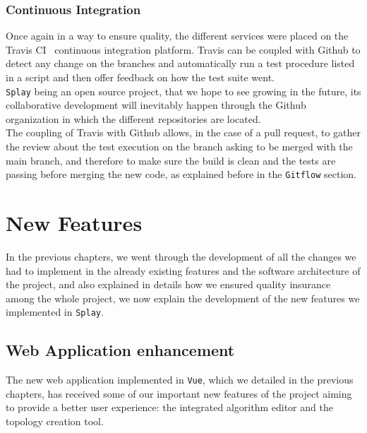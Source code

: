 \documentclass{eplmastersthesis}
\begin{document}
      \subsection{Continuous Integration}

        Once again in a way to ensure quality, the different services were placed
        on the Travis CI~\cite{travis} continuous integration platform. Travis
        can be coupled with Github to detect any change on the branches and
        automatically run a test procedure listed in a script and then offer
        feedback on how the test suite went.\\

        \texttt{Splay} being an open source project, that we hope to see growing in the
        future, its collaborative development will inevitably happen through
        the Github organization in which the different repositories are located.\\
        The coupling of Travis with Github allows, in the case of a pull request,
        to gather the review about the test execution on the branch asking to be
        merged with the main branch, and therefore to make sure the build is
        clean and the tests are passing before merging the new code, as
        explained before in the \texttt{Gitflow} section.

    \chapter{New Features}
    \label{chap:newfeat}

      In the previous chapters, we went through the development of all
      the changes we had to implement in the already existing features
      and the software architecture of the project, and also explained
      in details how we ensured quality insurance among the whole project,
      we now explain the development of the new features we implemented in
      \texttt{Splay}.

      \section{Web Application enhancement}

        The new web application implemented in \texttt{Vue}, which we detailed in
        the previous chapters, has received some of our important new features
        of the project aiming to provide a better user experience: the
        integrated algorithm editor and the topology creation tool.
\end{document}

